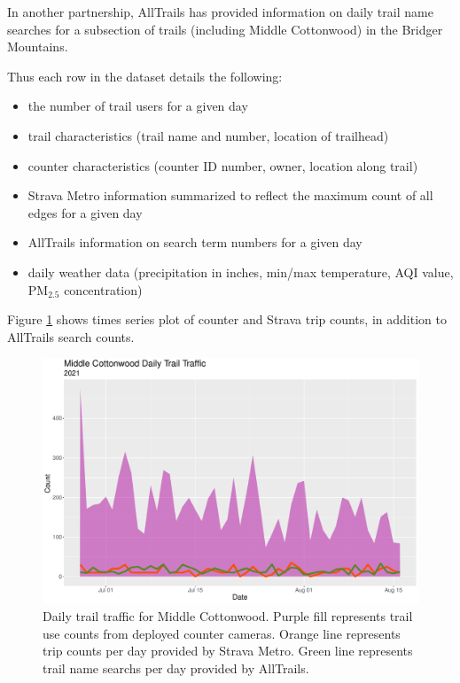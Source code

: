 \documentclass[
]{book}
\providecommand{\tightlist}{%
  \setlength{\itemsep}{0pt}\setlength{\parskip}{0pt}}
\begin{document}
In another partnership, AllTrails has provided information on daily trail name searches for a subsection of trails (including Middle Cottonwood) in the Bridger Mountains.

Thus each row in the dataset details the following:

\begin{itemize}
\tightlist
\item
  the number of trail users for a given day
\item
  trail characteristics (trail name and number, location of trailhead)
\item
  counter characteristics (counter ID number, owner, location along trail)
\item
  Strava Metro information summarized to reflect the maximum count of all edges for a given day
\item
  AllTrails information on search term numbers for a given day
\item
  daily weather data (precipitation in inches, min/max temperature, AQI value, PM\(_{2.5}\) concentration)
\end{itemize}

Figure \ref{fig:MidCotTS} shows times series plot of counter and Strava trip counts, in addition to AllTrails search counts.

\begin{figure}

{\centering \includegraphics[width=1\linewidth]{../figures/MiddleCottonwood_TS} 

}

\caption{Daily trail traffic for Middle Cottonwood. Purple fill represents trail use counts from deployed counter cameras. Orange line represents trip counts per day provided by Strava Metro. Green line represents trail name searchs per day provided by AllTrails.}\label{fig:MidCotTS}
\end{figure}
\end{document}
